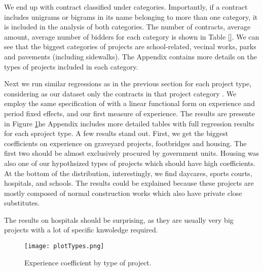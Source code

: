      We end up with contract classified under categories. Importantly, if a contract includes unigrams or bigrams in its name belonging to more than one category, it is included in the analysis of both categories. The number of contracts, average amount, average number of bidders for each category is shown in Table \ref{}. We can see that the biggest categories of projects are school-related, vecinal works, parks and pavements (including sidewalks). The Appendix contains more details on the types of projects included in each category.


     Next we run similar regressions as in the previous section for each project type, considering as our dataset only the contracts in that project category . We employ the same specification of with a linear functional form on experience and period fixed effects, and our first measure of experience. The results are presente in Figure \ref{fig:typeestimates}he Appendix includes more detailed tables with full regression results for each sproject type. A few results stand out. First, we get the biggest coefficients on experience on graveyard projects, footbridges and housing. The first two should be almost exclusively procured by government units. Housing was also one of our hypothsized types of projects which should have high coefficients. At the bottom of the distribution, interestingly, we find daycares, sports courts, hospitals, and schools. The results could be explained because these projects are mostly composed of normal construction works which also have private close substitutes.

     The results on hospitals should be surprising, as they are usually very big projects with a lot of specific knwoledge required.


     \begin{figure}
       \texttt{[image: plotTypes.png]}
       \caption{Experience coefficient by type of project.}
       \label{fig:typeestimates}
     \end{figure}
